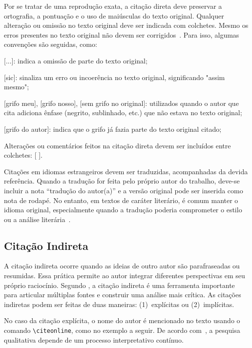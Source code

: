 \documentclass[
    12pt
    ,oneside
    ,a4paper
    ,chapter=TITLE
    ,section=TITLE
    ,sumario=abnt-6027-2012]{abntex2}
\begin{document}
Por se tratar de uma reprodução exata, a citação direta deve preservar a ortografia, a pontuação e o uso de maiúsculas do texto original. Qualquer alteração ou omissão no texto original deve ser indicada com colchetes. Mesmo os erros presentes no texto original não devem ser corrigidos~\cite{utp_normas2024}. Para isso, algumas convenções são seguidas, como:

\begin{alineas}
    \item {[...]}: indica a omissão de parte do texto original;
    \item {[sic]}: sinaliza um erro ou incoerência no texto original, significando "assim mesmo";
    \item {[grifo meu]}, [grifo nosso], [sem grifo no original]: utilizados quando o autor que cita adiciona ênfase (negrito, sublinhado, etc.) que não estava no texto original;
    \item {[grifo do autor]}: indica que o grifo já fazia parte do texto original citado;
    \item Alterações ou comentários feitos na citação direta devem ser incluídos entre colchetes: [ ].
\end{alineas}

Citações em idiomas estrangeiros devem ser traduzidas, acompanhadas da devida referência. Quando a tradução for feita pelo próprio autor do trabalho, deve-se incluir a nota ``tradução do autor(a)'' e a versão original pode ser inserida como nota de rodapé. No entanto, em textos de caráter literário, é comum manter o idioma original, especialmente quando a tradução poderia comprometer o estilo ou a análise literária~\cite{leite, utp_normas2024}.

\subsection{Citação Indireta}

A citação indireta ocorre quando as ideias de outro autor são parafraseadas ou resumidas. Essa prática permite ao autor integrar diferentes perspectivas em seu próprio raciocínio. Segundo , a citação indireta é uma ferramenta importante para articular múltiplas fontes e construir uma análise mais crítica. As citações indiretas podem ser feitas de duas maneiras: (1)~explícitas ou (2)~implícitas. 

No caso da citação explícita, o nome do autor é mencionado no texto usando o comando \texttt{\textbackslash citeonline}, como no exemplo a seguir. De acordo com~, a pesquisa qualitativa depende de um processo interpretativo contínuo.
\end{document}
